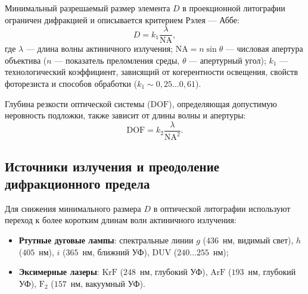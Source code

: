 \documentclass[12pt,a4paper]{article}
\theoremstyle{plain}
\theoremstyle{definition}
\theoremstyle{remark}
\numberwithin{equation}{section}
\begin{document}
Минимальный разрешаемый размер элемента $D$ в проекционной литографии ограничен дифракцией 
и описывается критерием Рэлея — Аббе:
\begin{equation*}
  D = k_1 \frac{\lambda}{\mathrm{NA}},
\end{equation*}
где $\lambda$ — длина волны актиничного излучения; $\mathrm{NA} = n \sin\theta$ — числовая 
апертура объектива ($n$ — показатель преломления среды, $\theta$ — апертурный угол); 
$k_1$ — технологический коэффициент, зависящий от когерентности освещения, свойств фоторезиста 
и способов обработки ($k_1 \sim 0{,}25 \dots 0{,}61$).

Глубина резкости оптической системы ($\mathrm{DOF}$), определяющая допустимую неровность 
подложки, также зависит от длины волны и апертуры:
\begin{equation*}
  \mathrm{DOF} = k_2 \frac{\lambda}{\mathrm{NA}^2}.
\end{equation*}

\subsection{Источники излучения и преодоление дифракционного предела}

Для снижения минимального размера $D$ в оптической литографии используют переход к 
более коротким длинам волн актиничного излучения:
\begin{itemize}
  \item \textbf{Ртутные дуговые лампы}: спектральные линии $g$ ($436$~нм, видимый свет), 
  $h$ ($405$~нм), $i$ ($365$~нм, ближний УФ), DUV ($240 \dots 255$~нм);
  \item \textbf{Эксимерные лазеры}: $\mathrm{KrF}$ ($248$~нм, глубокий УФ), $\mathrm{ArF}$ ($193$~нм, 
  глубокий УФ), $\mathrm{F}_2$ ($157$~нм, вакуумный УФ).
\end{itemize}
\end{document}
